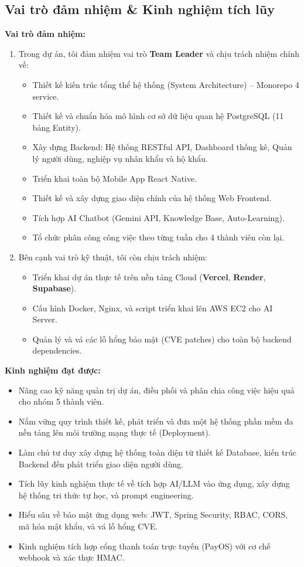 \documentclass[12pt,a4paper]{article}
\begin{document}
\subsection{Vai trò đảm nhiệm \& Kinh nghiệm tích lũy}
\textbf{Vai trò đảm nhiệm:} 
\begin{enumerate}
    \item Trong dự án, tôi đảm nhiệm vai trò \textbf{Team Leader} và chịu trách nhiệm chính về:
    \begin{itemize}
        \item Thiết kế kiến trúc tổng thể hệ thống (System Architecture) -- Monorepo 4 service.
        \item Thiết kế và chuẩn hóa mô hình cơ sở dữ liệu quan hệ PostgreSQL (11 bảng Entity).
        \item Xây dựng Backend: Hệ thống RESTful API, Dashboard thống kê, Quản lý người dùng, nghiệp vụ nhân khẩu và hộ khẩu.
        \item Triển khai toàn bộ Mobile App React Native.
        \item Thiết kế và xây dựng giao diện chính của hệ thống Web Frontend.
        \item Tích hợp AI Chatbot (Gemini API, Knowledge Base, Auto-Learning).
        \item Tổ chức phân công công việc theo từng tuần cho 4 thành viên còn lại.
    \end{itemize}
    \item Bên cạnh vai trò kỹ thuật, tôi còn chịu trách nhiệm:
    \begin{itemize}
        \item Triển khai dự án thực tế trên nền tảng Cloud (\textbf{Vercel}, \textbf{Render}, \textbf{Supabase}).
        \item Cấu hình Docker, Nginx, và script triển khai lên AWS EC2 cho AI Server.
        \item Quản lý và vá các lỗ hổng bảo mật (CVE patches) cho toàn bộ backend dependencies.
    \end{itemize}
\end{enumerate}

\textbf{Kinh nghiệm đạt được:} 
\begin{itemize}
    \item Nâng cao kỹ năng quản trị dự án, điều phối và phân chia công việc hiệu quả cho nhóm 5 thành viên.
    \item Nắm vững quy trình thiết kế, phát triển và đưa một hệ thống phần mềm đa nền tảng lên môi trường mạng thực tế (Deployment).
    \item Làm chủ tư duy xây dựng hệ thống toàn diện từ thiết kế Database, kiến trúc Backend đến phát triển giao diện người dùng.
    \item Tích lũy kinh nghiệm thực tế về tích hợp AI/LLM vào ứng dụng, xây dựng hệ thống tri thức tự học, và prompt engineering.
    \item Hiểu sâu về bảo mật ứng dụng web: JWT, Spring Security, RBAC, CORS, mã hóa mật khẩu, và vá lỗ hổng CVE.
    \item Kinh nghiệm tích hợp cổng thanh toán trực tuyến (PayOS) với cơ chế webhook và xác thực HMAC.
\end{itemize}
\end{document}
